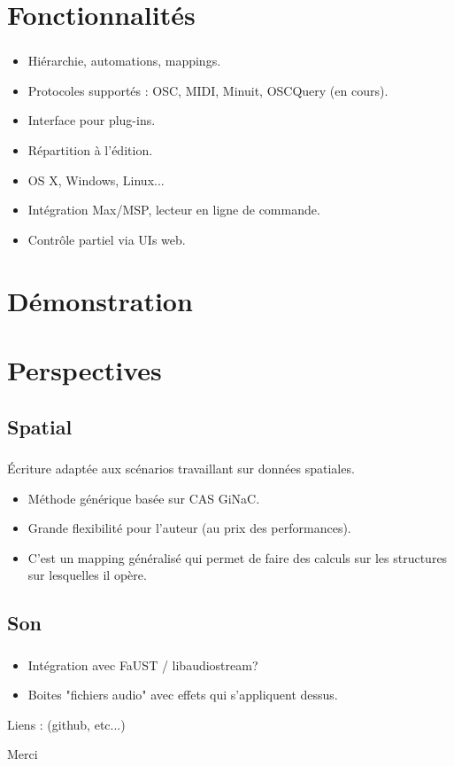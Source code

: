 \documentclass[french,12pt,t]{beamer}
\makeatletter
\newcommand*{\currentname}{\@currentlabelname}
\makeatother
\begin{document}
\section{Fonctionnalités}
\begin{frame}
    \frametitle{\currentname}
    \begin{itemize}
        \item Hiérarchie, automations, mappings.
        \item Protocoles supportés : OSC, MIDI, Minuit, OSCQuery (en cours).
        \item Interface pour plug-ins.
        \item Répartition à l'édition.
        \item OS X, Windows, Linux...
        \item Intégration Max/MSP, lecteur en ligne de commande.
        \item Contrôle partiel via UIs web.
    \end{itemize}
\end{frame}


\section{Démonstration}


\section{Perspectives}
\subsection{Spatial}
\begin{frame}
    \frametitle{\currentname}
    Écriture adaptée aux scénarios travaillant sur données spatiales.
    
    \begin{itemize}
        \item Méthode générique basée sur CAS GiNaC.
        \item Grande flexibilité pour l'auteur (au prix des performances).
        \item C'est un mapping généralisé qui permet de faire des calculs sur les structures sur lesquelles il opère.
    \end{itemize}
\end{frame}

\subsection{Son}
\begin{frame}
    \frametitle{\currentname}
    \begin{itemize}
        \item Intégration avec FaUST / libaudiostream?
        \item Boites "fichiers audio" avec effets qui s'appliquent dessus.        
    \end{itemize}
\end{frame}

\begin{frame}
    Liens : (github, etc...)
    
    Merci
\end{frame}
\end{document}
